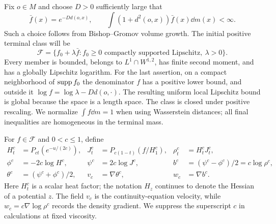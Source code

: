 Fix \(o\in M\) and choose \(D>0\) sufficiently large that
\begin{equation}
\label{heat:reference-density}
\bar f(x)=e^{-Dd(o,x)},\qquad
\int(1+d^2(o,x))\bar f(x)\dd m(x)<\infty.
\end{equation}
Such a choice follows from Bishop--Gromov volume growth.
The initial positive terminal class will be
\begin{equation}
\label{heat:positive-data}
\mathcal F=
\{f_0+\lambda\bar f:
  f_0\ge0\text{ compactly supported Lipschitz},\ \lambda>0\}.
\end{equation}
Every member is bounded, belongs to \(L^1\cap W^{1,2}\), has
finite second moment, and has a globally Lipschitz logarithm.
For the last assertion, on a compact neighborhood of
\(\operatorname{supp} f_0\) the denominator \(f\) has a positive lower bound,
and outside it \(\log f=\log\lambda-Dd(o,\cdot)\).
The resulting uniform local Lipschitz bound is global because
the space is a length space. The class is closed under positive
rescaling. We normalize \(\int f\dd m=1\) when using
Wasserstein distances; all final inequalities are homogeneous
in the terminal mass.

For \(f\in\mathcal F\) and \(0<c\le1\), define
\begin{align}
\label{heat:two-factors}
H_t^c&=P_{ct}(e^{-u/(2c)}),&
J_t^c&=P_{c(1-t)}(f/H_1^c),&
\rho_t^c&=H_t^cJ_t^c,\\
\label{heat:potentials}
\phi^c&=-2c\log H^c,&
\psi^c&=2c\log J^c,&
b^c&=(\psi^c-\phi^c)/2=c\log\rho^c,\\
\theta^c&=(\psi^c+\phi^c)/2,&
v_c&=\nabla\theta^c,&w_c&=\nabla b^c.
\end{align}
Here \(H_t^c\) is a scalar heat factor; the notation \(H_z\)
continues to denote the Hessian of a potential \(z\). The field
\(v_c\) is the continuity-equation velocity, while
\(w_c=c\nabla\log\rho^c\) records the density gradient. We suppress
the superscript \(c\) in calculations at fixed viscosity.

